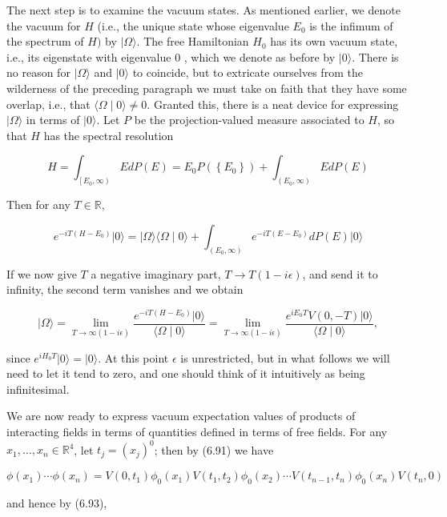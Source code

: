 \documentclass[10pt, letterpaper]{article}
\begin{document}
The next step is to examine the vacuum states. As mentioned earlier, we denote the vacuum for $H$ (i.e., the unique state whose eigenvalue $E_{0}$ is the infimum of the spectrum of $H)$ by $|\Omega\rangle$. The free Hamiltonian $H_{0}$ has its own vacuum state, i.e., its eigenstate with eigenvalue 0 , which we denote as before by $|0\rangle$. There is no reason for $|\Omega\rangle$ and $|0\rangle$ to coincide, but to extricate ourselves from the wilderness of the preceding paragraph we must take on faith that they have some overlap, i.e., that $\langle\Omega \mid 0\rangle \neq 0$. Granted this, there is a neat device for expressing $|\Omega\rangle$ in terms of $|0\rangle$. Let $P$ be the projection-valued measure associated to $H$, so that $H$ has the spectral resolution

$$
H=\int_{\left[E_{0}, \infty\right)} E d P(E)=E_{0} P\left(\left\{E_{0}\right\}\right)+\int_{\left(E_{0}, \infty\right)} E d P(E)
$$

Then for any $T \in \mathbb{R}$,

$$
e^{-i T\left(H-E_{0}\right)}|0\rangle=|\Omega\rangle\langle\Omega \mid 0\rangle+\int_{\left(E_{0}, \infty\right)} e^{-i T\left(E-E_{0}\right)} d P(E)|0\rangle
$$

If we now give $T$ a negative imaginary part, $T \rightarrow T(1-i \epsilon)$, and send it to infinity, the second term vanishes and we obtain

$$
|\Omega\rangle=\lim _{T \rightarrow \infty(1-i \epsilon)} \frac{e^{-i T\left(H-E_{0}\right)}|0\rangle}{\langle\Omega \mid 0\rangle}=\lim _{T \rightarrow \infty(1-i \epsilon)} \frac{e^{i E_{0} T} V(0,-T)|0\rangle}{\langle\Omega \mid 0\rangle},
$$

since $e^{i H_{0} T}|0\rangle=|0\rangle$. At this point $\epsilon$ is unrestricted, but in what follows we will need to let it tend to zero, and one should think of it intuitively as being infinitesimal.

We are now ready to express vacuum expectation values of products of interacting fields in terms of quantities defined in terms of free fields. For any $x_{1}, \ldots, x_{n} \in \mathbb{R}^{4}$, let $t_{j}=\left(x_{j}\right)^{0}$; then by (6.91) we have

$$
\phi\left(x_{1}\right) \cdots \phi\left(x_{n}\right)=V\left(0, t_{1}\right) \phi_{0}\left(x_{1}\right) V\left(t_{1}, t_{2}\right) \phi_{0}\left(x_{2}\right) \cdots V\left(t_{n-1}, t_{n}\right) \phi_{0}\left(x_{n}\right) V\left(t_{n}, 0\right)
$$

and hence by (6.93),
\end{document}

